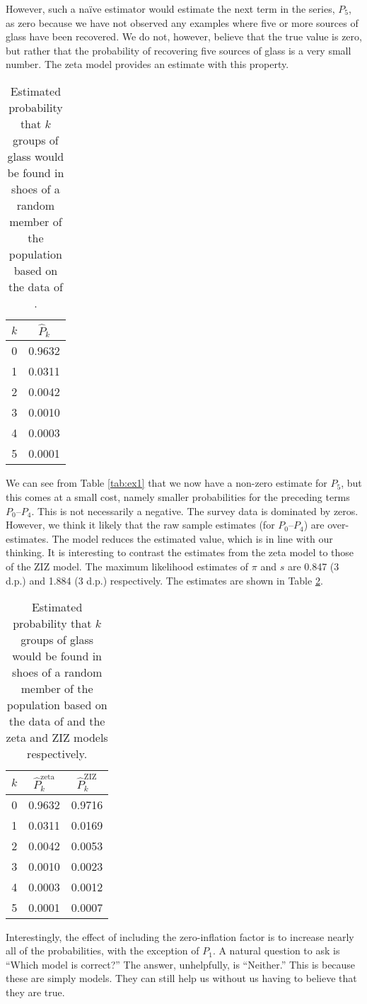 \documentclass{article}\usepackage[]{graphicx}\usepackage[]{xcolor}
\begin{document}
However, such a na\"{i}ve estimator would estimate the next term in the series, $P_5$, as zero because we have not observed any examples where five or more sources of glass have been recovered. We do not, however, believe that the true value is zero, but rather that the probability of recovering five sources of glass is a very small number. The zeta model provides an estimate with this property.
\begin{table}[ht]
    \centering
        \begin{tabular}{c|c}
             $k$ & $\hat{P}_k$ \\
              \hline
            0 & 0.9632 \\
            1 & 0.0311 \\
            2 & 0.0042 \\
            3 & 0.0010 \\
            4 & 0.0003 \\
            5 & 0.0001 \\
        \end{tabular}
      \caption{Estimated probability that $k$ groups of glass would be found in shoes of a random member of the population based on the data of \citep{roux2001}.}
      \label{tab:ex1c}
\end{table}
We can see from Table \ref{tab:ex1} that we now have a non-zero estimate for $P_5$,
but this comes at a small cost, namely smaller probabilities for the preceding terms $P_0$--$P_4$. This is not necessarily a negative. The survey data is dominated by zeros. However, we think it likely that the raw sample estimates (for $P_0$--$P_4$) are over-estimates. The model reduces the estimated value, which is in line with our thinking. It is interesting to contrast the estimates from the zeta model to those of the ZIZ model. The maximum likelihood estimates of $\pi$ and $s$ are 0.847 (3 d.p.) and 1.884 (3 d.p.) respectively. The estimates are shown in Table \ref{tab:ex1d}.
\begin{table}[ht]
\centering
\begin{tabular}{c|c|c}
   $k$ & $\hat{P}_k^{\mathrm{zeta}}$ & $\hat{P}_k^{\mathrm{ZIZ}}$ \\
  \hline
   0 & 0.9632 & 0.9716 \\
   1 & 0.0311 & 0.0169 \\
   2 & 0.0042 & 0.0053 \\
   3 & 0.0010 & 0.0023 \\
   4 & 0.0003 & 0.0012 \\
   5 & 0.0001 & 0.0007 \\
\end{tabular}
\caption{Estimated probability that $k$ groups of glass would be found in shoes of a random member of the population based on the data of \citep{roux2001}
and the zeta and ZIZ models respectively.}
      \label{tab:ex1d}
\end{table}
Interestingly, the effect of including the zero-inflation factor is to increase nearly all of the probabilities, with the exception of $P_1$. A natural question to ask is ``Which model is correct?'' The answer, unhelpfully, is ``Neither.'' This is because these are simply models. They can still help us without us having to believe that they are true.
\end{document}
